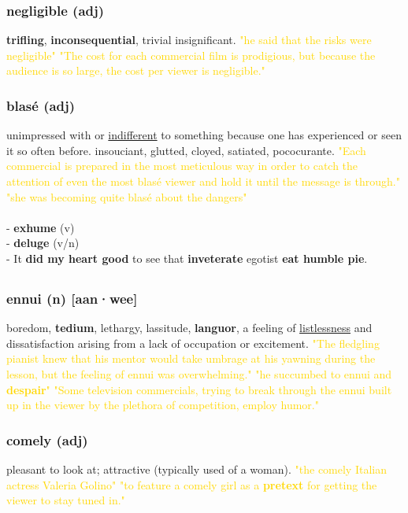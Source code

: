 \documentclass{proc}
\begin{document}
	\subsubsection{\textcolor{brickred}{negligible} (adj)}
	\textbf{trifling}, \textbf{inconsequential}, trivial
	insignificant.
	\textcolor{gold}{"he said that the risks were negligible" "The cost for each commercial film is prodigious, but because the audience is so large, the cost per viewer is negligible."}
	
	\subsubsection{\textcolor{brickred}{blasé} (adj)}
	unimpressed with or \underline{indifferent} to something because one has experienced or seen it so often before. insouciant, glutted, cloyed, satiated, pococurante.
	\textcolor{gold}{"Each commercial is prepared in the most meticulous way in order to catch the attention of even the most blasé viewer and hold it until the message is through." "she was becoming quite blasé about the dangers"}\\\\
	- \textbf{exhume} (v)\\
	- \textbf{deluge} (v/n)\\
	- It \textbf{did my heart good} to see that \textbf{inveterate} egotist \textbf{eat humble pie}.
	
	\newpage
	\subsection{}
	\subsubsection{\textcolor{brickred}{ennui} (n) [aan·wee]}
	boredom, \textbf{tedium}, lethargy, lassitude, \textbf{languor}, a feeling of \underline{listlessness} and dissatisfaction arising from a lack of occupation or excitement.
	\textcolor{gold}{"The fledgling pianist knew that his mentor would take umbrage at his yawning during the lesson, but the feeling of ennui was overwhelming." "he succumbed to ennui and \textbf{despair}" "Some television commercials, trying to break through the ennui built up in the viewer by the plethora of competition, employ humor."}
	
	\subsubsection{\textcolor{brickred}{comely} (adj)}
	pleasant to look at; attractive (typically used of a woman).
	\textcolor{gold}{"the comely Italian actress Valeria Golino" "to feature a comely girl as a \textbf{pretext} for getting the viewer to stay tuned in."}
	
\end{document}
